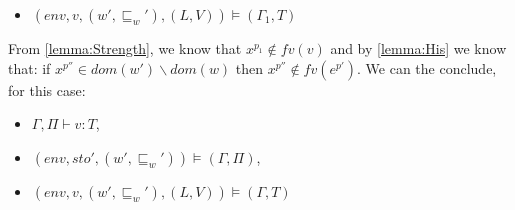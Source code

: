 \begin{description}
\begin{itemize}
			\item $(env,v,(w',\sqsubseteq_w'),(L,V))\models(\Gamma_1,T)$
		\end{itemize}
		From \cref{lemma:Strength}, we know that $x^{p_1}\notin fv(v)$ and by \cref{lemma:His} we know that: if $x^{p''}\in dom(w')\backslash dom(w)$ then $x^{p''}\notin fv(e^{p'})$.
		We can the conclude, for this case:
		\begin{itemize}
			\item $\Gamma,\Pi\vdash v:T$,
			\item $(env,sto',(w',\sqsubseteq_w'))\models(\Gamma,\Pi)$,
			\item $(env,v,(w',\sqsubseteq_w'),(L,V))\models(\Gamma,T)$
		\end{itemize}
\end{description}
